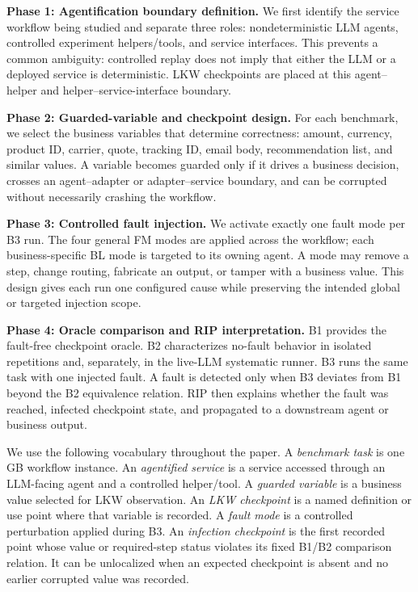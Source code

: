 \documentclass[sigconf,review,anonymous,balance=false]{acmart}
\begin{document}
\textbf{Phase 1: Agentification boundary definition.} We first identify the
service workflow being studied and separate three roles: nondeterministic LLM
agents, controlled experiment helpers/tools, and service interfaces. This
prevents a common ambiguity: controlled replay does not imply that either the
LLM or a deployed service is deterministic. LKW checkpoints are placed at this
agent--helper and helper--service-interface boundary.

\textbf{Phase 2: Guarded-variable and checkpoint design.} For each benchmark,
we select the business variables that determine correctness: amount, currency,
product ID, carrier, quote, tracking ID, email body, recommendation list, and
similar values. A variable becomes guarded only if it drives a business decision,
crosses an agent--adapter or adapter--service boundary, and can be corrupted
without necessarily crashing the workflow.

\textbf{Phase 3: Controlled fault injection.} We activate exactly one fault
mode per B3 run. The four general FM modes are applied across the workflow;
each business-specific BL mode is targeted to its owning agent. A mode may
remove a step, change routing, fabricate an output, or tamper with a business
value. This design gives each run one configured cause while preserving the
intended global or targeted injection scope.

\textbf{Phase 4: Oracle comparison and RIP interpretation.} B1 provides the
fault-free checkpoint oracle. B2 characterizes no-fault behavior in isolated
repetitions and, separately, in the live-LLM systematic runner. B3 runs the same
task with one injected fault. A fault is detected only when B3 deviates from B1
beyond the B2 equivalence relation. RIP then explains whether the fault was
reached, infected checkpoint state, and propagated to a downstream agent or
business output.

We use the following vocabulary throughout the paper. A \emph{benchmark task}
is one GB workflow instance. An \emph{agentified service} is a service
accessed through an LLM-facing agent and a controlled helper/tool. A
\emph{guarded variable} is a business value selected for LKW observation. An
\emph{LKW checkpoint} is a named definition or use point where that variable is
recorded. A \emph{fault mode} is a controlled perturbation applied during B3.
An \emph{infection checkpoint} is the first recorded point whose value or
required-step status violates its fixed B1/B2 comparison relation. It can be
unlocalized when an expected checkpoint is absent and no earlier corrupted
value was recorded.
\end{document}
